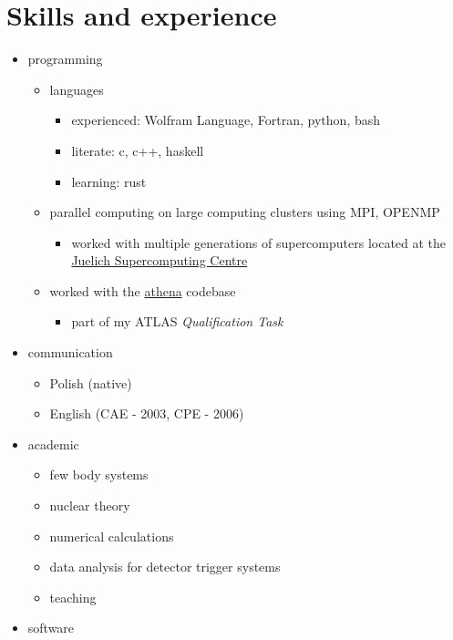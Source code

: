 \hypertarget{skills-and-experience}{%
\section{Skills and experience}\label{skills-and-experience}}

\begin{itemize}
\tightlist
\item
  programming

  \begin{itemize}
  \tightlist
  \item
    languages

    \begin{itemize}
    \tightlist
    \item
      experienced: Wolfram Language, Fortran, python, bash
    \item
      literate: c, c++, haskell
    \item
      learning: rust
    \end{itemize}
  \item
    parallel computing on large computing clusters using MPI, OPENMP

    \begin{itemize}
    \tightlist
    \item
      worked with multiple generations of supercomputers located at the
      \href{https://www.fz-juelich.de/en/ias/jsc/systems/supercomputers}{Juelich
      Supercomputing Centre}
    \end{itemize}
  \item
    worked with the \href{https://gitlab.cern.ch/atlas/athena}{athena}
    codebase

    \begin{itemize}
    \tightlist
    \item
      part of my ATLAS \emph{Qualification Task}
    \end{itemize}
  \end{itemize}
\item
  communication

  \begin{itemize}
  \tightlist
  \item
    Polish (native)
  \item
    English (CAE - 2003, CPE - 2006)
  \end{itemize}
\item
  academic

  \begin{itemize}
  \tightlist
  \item
    few body systems
  \item
    nuclear theory
  \item
    numerical calculations
  \item
    data analysis for detector trigger systems
  \item
    teaching
  \end{itemize}
\item
  software


\end{itemize}
